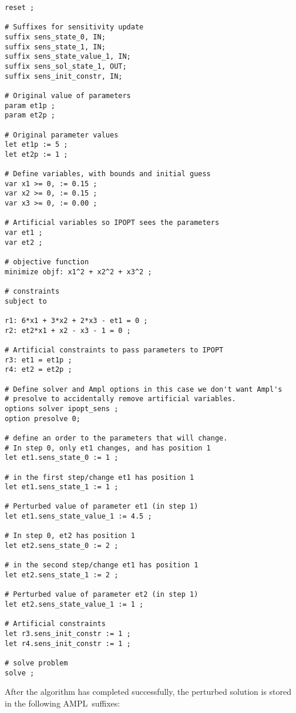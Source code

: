 \documentclass[letter, 11pt]{article}
\newcommand{\AMPL}{AMPL}
\begin{document}
\begin{lstlisting}[language=ampl, caption={\AMPL\ code for sensitivity update of Problem \ref{eq:exr}.}, label={ampl:ex2}, frame=single, captionpos=b]
reset ;

# Suffixes for sensitivity update
suffix sens_state_0, IN;
suffix sens_state_1, IN;
suffix sens_state_value_1, IN;
suffix sens_sol_state_1, OUT;
suffix sens_init_constr, IN;

# Original value of parameters
param et1p ;
param et2p ;

# Original parameter values
let et1p := 5 ;
let et2p := 1 ;

# Define variables, with bounds and initial guess
var x1 >= 0, := 0.15 ;
var x2 >= 0, := 0.15 ;
var x3 >= 0, := 0.00 ;

# Artificial variables so IPOPT sees the parameters
var et1 ;
var et2 ;

# objective function
minimize objf: x1^2 + x2^2 + x3^2 ;

# constraints
subject to

r1: 6*x1 + 3*x2 + 2*x3 - et1 = 0 ;
r2: et2*x1 + x2 - x3 - 1 = 0 ;

# Artificial constraints to pass parameters to IPOPT
r3: et1 = et1p ;
r4: et2 = et2p ;

# Define solver and Ampl options in this case we don't want Ampl's
# presolve to accidentally remove artificial variables.
options solver ipopt_sens ;
option presolve 0;

# define an order to the parameters that will change.
# In step 0, only et1 changes, and has position 1
let et1.sens_state_0 := 1 ;

# in the first step/change et1 has position 1
let et1.sens_state_1 := 1 ;

# Perturbed value of parameter et1 (in step 1)
let et1.sens_state_value_1 := 4.5 ;

# In step 0, et2 has position 1
let et2.sens_state_0 := 2 ;

# in the second step/change et1 has position 1
let et2.sens_state_1 := 2 ;

# Perturbed value of parameter et2 (in step 1)
let et2.sens_state_value_1 := 1 ;

# Artificial constraints
let r3.sens_init_constr := 1 ;
let r4.sens_init_constr := 1 ;

# solve problem
solve ;
\end{lstlisting}



After the algorithm has completed successfully, the perturbed solution is stored in the following \AMPL\ suffixes:
\end{document}
